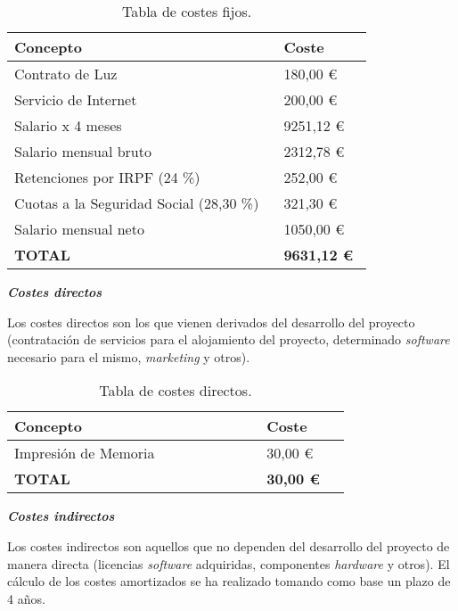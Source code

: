 \begin{table}[H]
	\centering
	\begin{tabular}{>{\raggedright}b{0.6\linewidth}>{\raggedleft\arraybackslash}b{0.2\linewidth}}
		\toprule
		\textbf{{Concepto}}  & \textbf{{Coste}} \\
		\midrule
		\small{\; Contrato de Luz} & \small{180,00 €} \\		
		\midrule
		\small{\; Servicio de Internet} & \small{200,00 €} \\		
		\midrule
		\small{\; Salario x 4 meses} & \small{9251,12 €} \\
		\cline{2-2}
		\scriptsize{\qquad Salario mensual bruto} & \scriptsize{2312,78 €} \\
		\scriptsize{\qquad Retenciones por IRPF (24 \%)} & \scriptsize{252,00 €} \\
		\scriptsize{\qquad Cuotas a la Seguridad Social (28,30 \%)} & \scriptsize{321,30 €} \\
		\scriptsize{\qquad Salario mensual neto} & \scriptsize{1050,00 €} \\
		\bottomrule
		\textbf{{\scriptsize TOTAL}}  & \textbf{\small 9631,12 €} \\
		\bottomrule
	\end{tabular}
	\caption{Tabla de costes fijos.}
\end{table}

\textbf{\textit{Costes directos}}

Los costes directos son los que vienen derivados del desarrollo del proyecto (contratación de servicios para el alojamiento del proyecto, determinado \textit{software} necesario para el mismo, \textit{marketing} y otros).

\begin{table}[H]
	\centering
	\begin{tabular}{>{\raggedright}b{0.6\linewidth}>{\raggedleft\arraybackslash}b{0.2\linewidth}}
		\toprule
		\textbf{{Concepto}}  & \textbf{{Coste}} \\
		\midrule
		\small{\scriptsize Impresión de Memoria} & \small{30,00 €} \\
		\bottomrule
		\textbf{{\scriptsize TOTAL}}  & \textbf{\small 30,00 €} \\
		\bottomrule
	\end{tabular}
	\caption{Tabla de costes directos.}
\end{table}

\textbf{\textit{Costes indirectos}}

Los costes indirectos son aquellos que no dependen del desarrollo del proyecto de manera directa (licencias \textit{software} adquiridas, componentes \textit{hardware} y otros). El cálculo de los costes amortizados se ha realizado tomando como base un plazo de 4 años.

